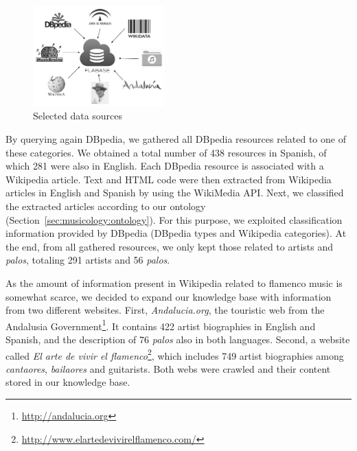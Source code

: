 \begin{figure}
	\centering
	\includegraphics[width=0.45\textwidth]{ch05_musicology_pics/datasources_bn.png}
	\caption{Selected data sources \label{fig:musicology:datasources}}
\end{figure}

By querying again DBpedia, we gathered all DBpedia resources related to one of these categories. We obtained a total number of 438 resources in Spanish, of which 281 were also in English. Each DBpedia resource is associated with a Wikipedia article. Text and HTML code were then extracted from Wikipedia articles in English and Spanish by using the WikiMedia API. 
Next, we classified the extracted articles according to our ontology (Section~\ref{sec:musicology:ontology}). For this purpose, we exploited classification information provided by DBpedia (DBpedia types and Wikipedia categories). At the end, from all gathered resources, we only kept those related to artists and \textit{palos}, totaling  291 artists and 56 \textit{palos}.

As the amount of information present in Wikipedia related to flamenco music is somewhat scarce, we decided to expand our knowledge base with information from two different websites. First, \textit{Andalucia.org}, the touristic web from the Andalusia Government\footnote{\url{http://andalucia.org}}. It contains 422 artist biographies in English and Spanish, and the description of 76 \textit{palos} also in both languages. Second, a website called \textit{El arte de vivir el flamenco}\footnote{\url{http://www.elartedevivirelflamenco.com/}}, which includes 749 artist biographies among \textit{cantaores}, \textit{bailaores} and guitarists. Both webs were crawled and their content stored in our knowledge base. %


